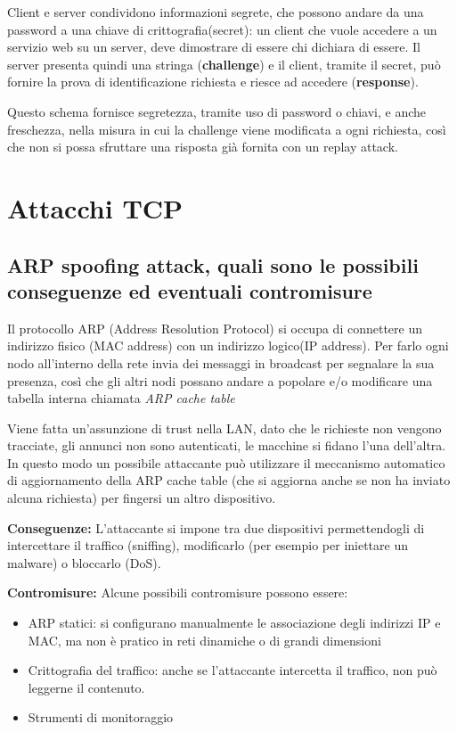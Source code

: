 \documentclass{report}
\begin{document}
\noindent Client e server condividono informazioni segrete, che possono andare da una password a una chiave di crittografia(secret):
un client che vuole accedere a un servizio web su un server, deve dimostrare di essere chi dichiara di essere. Il server presenta quindi 
una stringa (\textbf{challenge}) e il client, tramite il secret, può fornire la prova di identificazione richiesta e riesce ad accedere (\textbf{response}).

\noindent Questo schema fornisce segretezza, tramite uso di password o chiavi, e anche freschezza, nella misura in cui la challenge viene modificata a ogni richiesta, così
che non si possa sfruttare una risposta già fornita con un replay attack.


\chapter{Attacchi TCP}

\section{ARP spoofing attack, quali sono le possibili conseguenze ed eventuali contromisure}
\noindent Il protocollo ARP (Address Resolution Protocol) si occupa di connettere un indirizzo fisico (MAC address) con un indirizzo logico(IP address). Per farlo ogni nodo all'interno della rete invia dei messaggi in broadcast
per segnalare la sua presenza, così che gli altri nodi possano andare a popolare e/o modificare una tabella interna chiamata \textit{ARP cache table}

\noindent Viene fatta un'assunzione di trust nella LAN, dato che le richieste non vengono tracciate, gli annunci non sono autenticati, le macchine si fidano l'una dell'altra.
In questo modo un possibile attaccante può utilizzare il meccanismo automatico di aggiornamento della ARP cache table (che si aggiorna anche se non ha inviato alcuna richiesta) per fingersi un altro dispositivo.

\noindent \textbf{Conseguenze:} L'attaccante si impone tra due dispositivi permettendogli di intercettare il traffico (sniffing), modificarlo (per esempio per iniettare un malware) o
bloccarlo (DoS).

\noindent \textbf{Contromisure:} Alcune possibili contromisure possono essere:
\begin{itemize}
    \item ARP statici: si configurano manualmente le associazione degli indirizzi IP e MAC, ma non è pratico in reti dinamiche o di grandi dimensioni
    \item Crittografia del traffico: anche se l'attaccante intercetta il traffico, non può leggerne il contenuto.
    \item Strumenti di monitoraggio 
\end{itemize}
\end{document}
